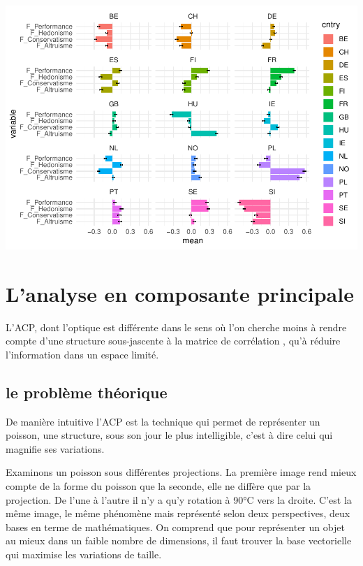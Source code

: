 \documentclass[
]{book}
\begin{document}
\includegraphics{bookdown-demo_files/figure-latex/0605-1.pdf}

\hypertarget{lanalyse-en-composante-principale}{%
\section{L'analyse en composante principale}\label{lanalyse-en-composante-principale}}

L'ACP, dont l'optique est différente dans le sens où l'on cherche moins à rendre compte d'une structure sous-jascente à la matrice de corrélation , qu'à réduire l'information dans un espace limité.

\hypertarget{le-probluxe8me-thuxe9orique}{%
\subsection{le problème théorique}\label{le-probluxe8me-thuxe9orique}}

De manière intuitive l'ACP est la technique qui permet de représenter un poisson, une structure, sous son jour le plus intelligible, c'est à dire celui qui magnifie ses variations.

Examinons un poisson sous différentes projections. La première image rend mieux compte de la forme du poisson que la seconde, elle ne diffère que par la projection. De l'une à l'autre il n'y a qu'y rotation à 90°C vers la droite. C'est la même image, le même phénomène mais représenté selon deux perspectives, deux bases en terme de mathématiques. On comprend que pour représenter un objet au mieux dans un faible nombre de dimensions, il faut trouver la base vectorielle qui maximise les variations de taille.
\end{document}
